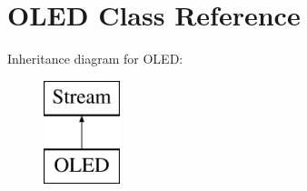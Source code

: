 \hypertarget{class_o_l_e_d}{\section{O\-L\-E\-D Class Reference}
\label{class_o_l_e_d}
}
Inheritance diagram for O\-L\-E\-D\-:\begin{figure}[H]
\begin{center}
\leavevmode
\includegraphics[height=3.000000cm]{class_o_l_e_d}
\end{center}
\end{figure}
